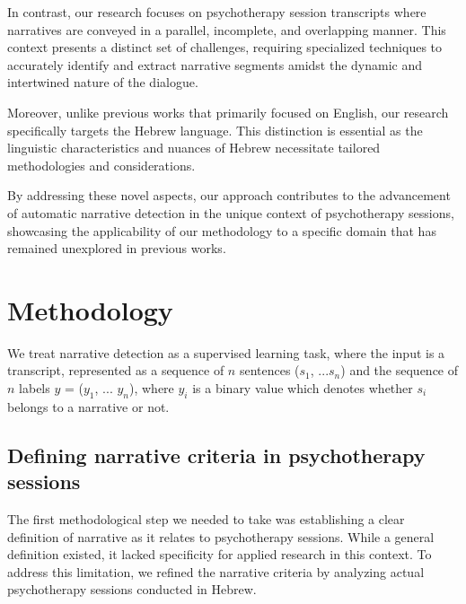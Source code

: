 \documentclass[preprint,12pt]{elsarticle}
\begin{document}
In contrast, our research focuses on psychotherapy session transcripts where narratives are conveyed in a parallel, incomplete, and overlapping manner. This context presents a distinct set of challenges, requiring specialized techniques to accurately identify and extract narrative segments amidst the dynamic and intertwined nature of the dialogue.

Moreover, unlike previous works that primarily focused on English, our research specifically targets the Hebrew language. This distinction is essential as the linguistic characteristics and nuances of Hebrew necessitate tailored methodologies and considerations.

By addressing these novel aspects, our approach contributes to the advancement of automatic narrative detection in the unique context of psychotherapy sessions, showcasing the applicability of our methodology to a specific domain that has remained unexplored in previous works.

\section{Methodology}

We treat narrative detection as a supervised learning task, where the input is a transcript, represented as a sequence of $n$ sentences ($s_{1}$, ...$s_{n}$) and the sequence of $n$ labels $y$ = ($y_{1}$, ... $y_{n}$), where $y_{i}$ is a binary value which denotes whether $s_{i}$ belongs to a narrative or not.

\subsection{Defining narrative criteria in psychotherapy sessions}

The first methodological step we needed to take was establishing  a clear definition of narrative as it relates to psychotherapy sessions. While a general definition existed, it lacked specificity for applied research in this context. To address this limitation, we refined the narrative criteria by analyzing actual psychotherapy sessions conducted in Hebrew.
\end{document}
